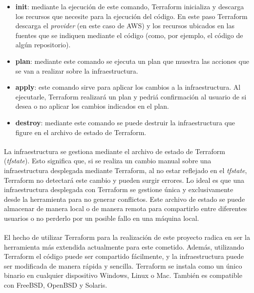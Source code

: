 \documentclass[../../memoria.tex]{subfiles}
\begin{document}
\begin{itemize}
    \item \textbf{init}: mediante la ejecución de este comando, Terraform inicializa y descarga los recursos que necesite para la ejecución del código. En este paso Terraform descarga el \textit{provider} (en este caso de AWS) y los recursos ubicados en las fuentes que se indiquen mediante el código (como, por ejemplo, el código de algún repositorio).

    \item \textbf{plan}: mediante este comando se ejecuta un plan que muestra las acciones que se van a realizar sobre la infraestructura.

    \item \textbf{apply}: este comando sirve para aplicar los cambios a la infraestructura. Al ejecutarle, Terraform realizará un plan y pedriá confirmación al usuario de si desea o no aplicar los cambios indicados en el plan.

    \item \textbf{destroy}: mediante este comando se puede destruir la infraestructura que figure en el archivo de estado de Terraform.
\end{itemize}

\paragraph{}
La infraestructura se gestiona mediante el archivo de estado de Terraform (\textit{tfstate}). Esto significa que, si se realiza un cambio manual sobre una infraestructura desplegada mediante Terraform, al no estar reflejado en el \textit{tfstate}, Terraform no detectará este cambio y pueden surgir errores. Lo ideal es que una infraestructura desplegada con Terraform se gestione única y exclusivamente desde la herramienta para no generar conflictos. Este archivo de estado se puede almacenar de manera local o de manera remota para compartirlo entre diferentes usuarios o no perderlo por un posible fallo en una máquina local.

\paragraph{}
El hecho de utilizar Terraform para la realización de este proyecto radica en ser la herramienta más extendida actualmente para este cometido. Además, utilizando Terraform el código puede ser compartido fácilmente, y la infraestructura puede ser modificada de manera rápida y sencilla. Terraform se instala como un único binario en cualquier dispositivo Windows, Linux o Mac. También es compatible con FreeBSD, OpenBSD y Solaris.
\end{document}
